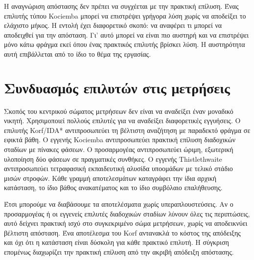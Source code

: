 Η αναγνώριση απόστασης δεν πρέπει να συγχέεται με την πρακτική επίλυση. Ένας επιλυτής τύπου Kociemba μπορεί να επιστρέψει γρήγορα λύση χωρίς να αποδείξει το ελάχιστο μήκος. Η εντολή  έχει διαφορετικό σκοπό: να αναφέρει τι μπορεί να αποδειχθεί για την απόσταση. Γι' αυτό μπορεί να είναι πιο αυστηρή και να επιστρέψει μόνο κάτω φράγμα εκεί όπου ένας πρακτικός επιλυτής βρίσκει λύση. Η αυστηρότητα αυτή επιβάλλεται από το ίδιο το θέμα της εργασίας.

\section{Συνδυασμός επιλυτών στις μετρήσεις}
\label{sec:algorithms-solver-mix}
Σκοπός του κεντρικού σώματος μετρήσεων δεν είναι να αναδείξει έναν μοναδικό νικητή. Χρησιμοποιεί πολλούς επιλυτές για να αναδείξει διαφορετικές εγγυήσεις. Ο επιλυτής Korf/IDA* αντιπροσωπεύει τη βέλτιστη αναζήτηση με παραδεκτό φράγμα σε εφικτά βάθη. Ο εγγενής Kociemba αντιπροσωπεύει πρακτική επίλυση διαδοχικών σταδίων με πίνακες φάσεων. Ο προσαρμογέας αντιπροσωπεύει ώριμη, εξωτερική υλοποίηση δύο φάσεων σε πραγματικές συνθήκες. Ο εγγενής Thistlethwaite αντιπροσωπεύει τετραφασική εκπαιδευτική αλυσίδα υποομάδων με τελικό στάδιο μισών στροφών. Κάθε γραμμή αποτελεσμάτων καταγράφει την ίδια αρχική κατάσταση, το ίδιο βάθος ανακατέματος και το ίδιο συμβόλαιο επαλήθευσης.

Έτσι μπορούμε να διαβάσουμε τα αποτελέσματα χωρίς υπεραπλουστεύσεις. Αν ο προσαρμογέας ή οι εγγενείς επιλυτές διαδοχικών σταδίων λύνουν όλες τις περιπτώσεις, αυτό δείχνει πρακτική ισχύ στο συγκεκριμένο σώμα μετρήσεων, χωρίς να αποδεικνύει βέλτιστη απόσταση. Ένα αποτέλεσμα  του Korf αντανακλά το κόστος της απόδειξης και όχι ότι η κατάσταση είναι δύσκολη για κάθε πρακτικό επιλυτή. Η σύγκριση επομένως διαχωρίζει την πρακτική επίλυση από την ακριβή απόδειξη απόστασης.
